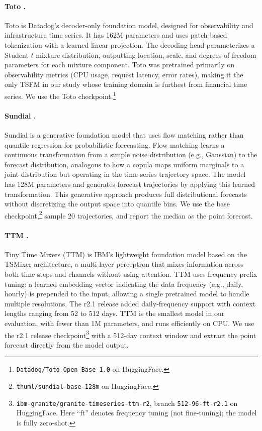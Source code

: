 \documentclass[12pt]{article}
\begin{document}
\paragraph{\textbf{Toto} \citep{cohen2024toto}.}
Toto is Datadog's decoder-only foundation model, designed for observability and infrastructure time series. It has 162M parameters and uses patch-based tokenization with a learned linear projection. The decoding head parameterizes a Student-$t$ mixture distribution, outputting location, scale, and degrees-of-freedom parameters for each mixture component. Toto was pretrained primarily on observability metrics (CPU usage, request latency, error rates), making it the only TSFM in our study whose training domain is furthest from financial time series. We use the Toto checkpoint.\footnote{\texttt{Datadog/Toto-Open-Base-1.0} on HuggingFace.}

\paragraph{\textbf{Sundial} \citep{liu2025sundial}.}
Sundial is a generative foundation model that uses flow matching rather than quantile regression for probabilistic forecasting. Flow matching learns a continuous transformation from a simple noise distribution (e.g., Gaussian) to the forecast distribution, analogous to how a copula maps uniform marginals to a joint distribution but operating in the time-series trajectory space. The model has 128M parameters and generates forecast trajectories by applying this learned transformation. This generative approach produces full distributional forecasts without discretizing the output space into quantile bins. We use the base checkpoint,\footnote{\texttt{thuml/sundial-base-128m} on HuggingFace.} sample 20 trajectories, and report the median as the point forecast.

\paragraph{\textbf{TTM} \citep{ekambaram2024ttm}.}
Tiny Time Mixers (TTM) is IBM's lightweight foundation model based on the TSMixer architecture, a multi-layer perceptron that mixes information across both time steps and channels without using attention. TTM uses frequency prefix tuning: a learned embedding vector indicating the data frequency (e.g., daily, hourly) is prepended to the input, allowing a single pretrained model to handle multiple resolutions. The r2.1 release added daily-frequency support with context lengths ranging from 52 to 512 days. TTM is the smallest model in our evaluation, with fewer than 1M parameters, and runs efficiently on CPU. We use the r2.1 release checkpoint\footnote{\texttt{ibm-granite/granite-timeseries-ttm-r2}, branch \texttt{512-96-ft-r2.1} on HuggingFace. Here ``ft'' denotes frequency tuning (not fine-tuning); the model is fully zero-shot.} with a 512-day context window and extract the point forecast directly from the model output.
\end{document}
